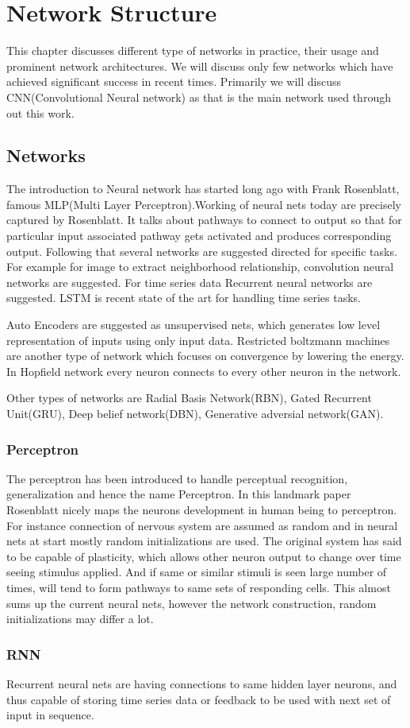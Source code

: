 

\chapter{Network Structure}\label{chap:nwstruct}

This chapter discusses different type of networks in practice, their usage and prominent network architectures. We will discuss only few networks which have achieved significant success in recent times. Primarily we will discuss CNN(Convolutional Neural network) as that is the main network used through out this work.

\section{Networks}
The introduction to Neural network has started long ago with Frank Rosenblatt, famous MLP(Multi Layer Perceptron)\cite{Rosenblatt58theperceptron:}.Working of neural nets today are precisely captured by Rosenblatt.
It talks about pathways to connect to output so that for particular input associated pathway gets activated and produces corresponding output.
Following that several networks are suggested directed for specific tasks. For example for image to extract neighborhood relationship, convolution neural networks are suggested. For time series data Recurrent neural networks are suggested. LSTM is recent state of the art for handling time series tasks.

Auto Encoders are suggested as unsupervised nets, which generates low level representation of inputs using only input data. 
Restricted boltzmann machines are another type of network which focuses on convergence by lowering the energy.
In Hopfield network every neuron connects to every other neuron in the network.

Other types of networks are Radial Basis Network(RBN), Gated Recurrent Unit(GRU), Deep belief network(DBN), Generative adversial network(GAN).


\subsection{Perceptron}
The perceptron has been introduced to handle perceptual recognition, generalization and hence the name Perceptron. In this landmark paper Rosenblatt nicely maps the neurons development in human being to perceptron.
For instance connection of nervous system are assumed as random and in neural nets at start mostly random initializations are used.
The original system has said to be capable of plasticity, which allows other neuron output to change over time seeing stimulus applied. And if same or similar stimuli is seen large number of times, will tend to form pathways to same sets of responding cells. This almost sums up the current neural nets, however the network construction, random initializations may differ a lot. 

\subsection{RNN}
Recurrent neural nets are having connections to same hidden layer neurons, and thus capable of storing time series data or feedback to be used with next set of input in sequence.






\doublespacing\normalsize
